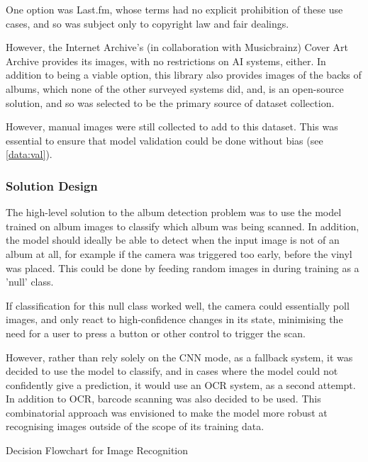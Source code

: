                 One option was Last.fm, whose terms had no explicit prohibition of these use cases, and so was subject only to copyright law and fair dealings.
    
                However, the Internet Archive's (in collaboration with Musicbrainz) Cover Art Archive provides its images, with no restrictions on AI systems, either. In addition to being a viable option, this library also provides images of the backs of albums, which none of the other surveyed systems did, and, is an open-source solution, and so was selected to be the primary source of dataset collection.
    
                However, manual images were still collected to add to this dataset. This was essential to ensure that model validation could be done without bias (see \ref{data:val}).
    
            \subsubsection{Solution Design}
    
                The high-level solution to the album detection problem was to use the model trained on album images to classify which album was being scanned. In addition, the model should ideally be able to detect when the input image is not of an album at all,  for example if the camera was triggered too early, before the vinyl was placed. This could be done by feeding random images in during training as a 'null' class.
    
                If classification for this null class worked well, the camera could essentially poll images, and only react to high-confidence changes in its state, minimising the need for a user to press a button or other control to trigger the scan.
    
                However, rather than rely solely on the CNN mode, as a fallback system, it was decided to use the model to classify, and in cases where the model could not confidently give a prediction, it would use an OCR system, as a second attempt. In addition to OCR, barcode scanning was also decided to be used. This combinatorial approach was envisioned to make the model more robust at recognising images outside of the scope of its training data.
    
                \begin{temp}
                    Decision Flowchart for Image Recognition
                \end{temp}
        
